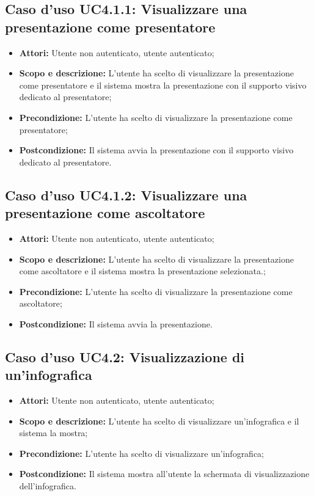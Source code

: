 \subsection{Caso d'uso UC4.1.1: Visualizzare una presentazione come presentatore}
\begin{itemize}
	\item \textbf{Attori:} Utente non autenticato, utente autenticato;
	\item \textbf{Scopo e descrizione:} L'utente ha scelto di visualizzare la presentazione come presentatore e il sistema mostra la presentazione con il supporto visivo dedicato al presentatore;
	\item \textbf{Precondizione:} L'utente ha scelto di visualizzare la presentazione come presentatore;
	\item \textbf{Postcondizione:} Il sistema avvia la presentazione con il supporto visivo dedicato al presentatore.
\end{itemize}

\subsection{Caso d'uso UC4.1.2: Visualizzare una presentazione come ascoltatore}
\begin{itemize}
	\item \textbf{Attori:} Utente non autenticato, utente autenticato;
	\item \textbf{Scopo e descrizione:} L'utente ha scelto di visualizzare la presentazione come ascoltatore e il sistema mostra la presentazione selezionata.;
	\item \textbf{Precondizione:} L'utente ha scelto di visualizzare la presentazione come ascoltatore;
	\item \textbf{Postcondizione:} Il sistema avvia la presentazione.
\end{itemize}

\subsection{Caso d'uso UC4.2: Visualizzazione di un'infografica}
\begin{itemize}
	\item \textbf{Attori:} Utente non autenticato, utente autenticato;
	\item \textbf{Scopo e descrizione:} L'utente ha scelto di visualizzare un'infografica e il sistema la mostra;
	\item \textbf{Precondizione:} L'utente ha scelto di visualizzare un'infografica;
	\item \textbf{Postcondizione:} Il sistema mostra all'utente la schermata di visualizzazione dell'infografica.
\end{itemize}